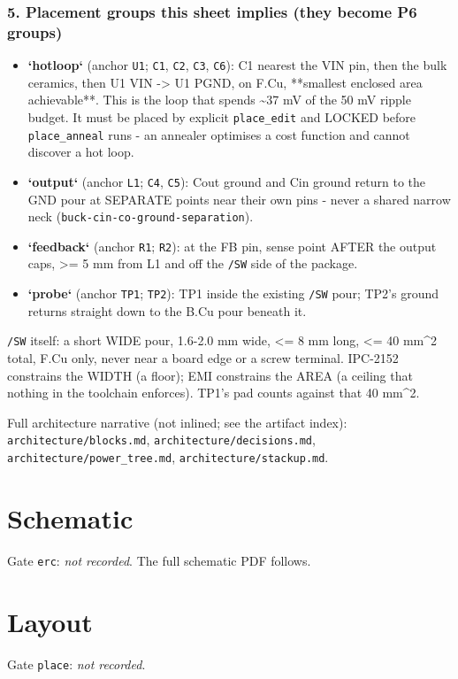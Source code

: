 \documentclass[11pt,a4paper]{article}
\begin{document}
\subsubsection*{5. Placement groups this sheet implies (they become P6 groups)}
\begin{itemize}
\item \textbf{`hotloop`} (anchor \texttt{U1}; \texttt{C1}, \texttt{C2}, \texttt{C3}, \texttt{C6}): C1 nearest the VIN
pin, then the bulk ceramics, then U1 VIN -\textgreater{} U1 PGND, on F.Cu, {*}{*}smallest
enclosed area achievable{*}{*}. This is the loop that spends \textasciitilde{}37 mV of the
50 mV ripple budget. It must be placed by explicit \texttt{place\_edit} and LOCKED
before \texttt{place\_anneal} runs - an annealer optimises a cost function and
cannot discover a hot loop.
\item \textbf{`output`} (anchor \texttt{L1}; \texttt{C4}, \texttt{C5}): Cout ground and Cin ground return
to the GND pour at SEPARATE points near their own pins - never a shared
narrow neck (\texttt{buck-cin-co-ground-separation}).
\item \textbf{`feedback`} (anchor \texttt{R1}; \texttt{R2}): at the FB pin, sense point AFTER the
output caps, \textgreater{}= 5 mm from L1 and off the \texttt{/SW} side of the package.
\item \textbf{`probe`} (anchor \texttt{TP1}; \texttt{TP2}): TP1 inside the existing \texttt{/SW} pour;
TP2's ground returns straight down to the B.Cu pour beneath it.
\end{itemize}
\texttt{/SW} itself: a short WIDE pour, 1.6-2.0 mm wide, \textless{}= 8 mm long, \textless{}= 40 mm\textasciicircum{}2 total, F.Cu only, never near a board edge or a screw terminal. IPC-2152 constrains the WIDTH (a floor); EMI constrains the AREA (a ceiling that nothing in the toolchain enforces). TP1's pad counts against that 40 mm\textasciicircum{}2.

Full architecture narrative (not inlined; see the artifact index): \texttt{architecture/blocks.md}, \texttt{architecture/decisions.md}, \texttt{architecture/power\_tree.md}, \texttt{architecture/stackup.md}.
\section{Schematic}
Gate \texttt{erc}: \emph{not recorded}.
The full schematic PDF follows.

\section{Layout}
Gate \texttt{place}: \emph{not recorded}.
\end{document}
